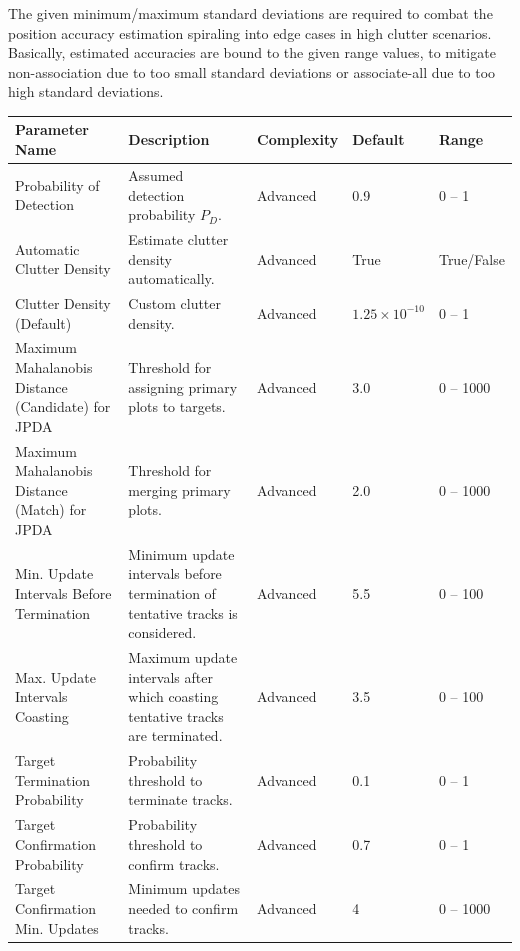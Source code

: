 The given minimum/maximum standard deviations are required to combat the position accuracy estimation spiraling into edge cases in high clutter scenarios. 
Basically, estimated accuracies are bound to the given range values, to mitigate non-association due to too small standard deviations or associate-all due to too high standard deviations. \\


\begin{table}[H]
    \centering
    \footnotesize
    \hspace*{-1.5cm}
    \begin{tabular}{|p{4.5cm}|p{6.5cm}|l|l|l|}
    \hline
    \textbf{Parameter Name} & \textbf{Description} & \textbf{Complexity} & \textbf{Default} & \textbf{Range} \\ \hline
    Probability of Detection & Assumed detection probability $P_D$. & Advanced & 0.9 & 0 -- 1 \\ \hline
    Automatic Clutter Density & Estimate clutter density automatically. & Advanced & True & True/False \\ \hline
    Clutter Density (Default) & Custom clutter density. & Advanced & $1.25 \times 10^{-10}$ & 0 -- 1 \\ \hline
    Maximum Mahalanobis Distance (Candidate) for JPDA & Threshold for assigning primary plots to targets. & Advanced & 3.0 & 0 -- 1000 \\ \hline
    Maximum Mahalanobis Distance (Match) for JPDA & Threshold for merging primary plots. & Advanced & 2.0 & 0 -- 1000 \\ \hline
    Min. Update Intervals Before Termination & Minimum update intervals before termination of tentative tracks is considered. & Advanced & 5.5 & 0 -- 100 \\ \hline
    Max. Update Intervals Coasting & Maximum update intervals after which coasting tentative tracks are terminated. & Advanced & 3.5 & 0 -- 100 \\ \hline
    Target Termination Probability & Probability threshold to terminate tracks. & Advanced & 0.1 & 0 -- 1 \\ \hline 
    Target Confirmation Probability & Probability threshold to confirm tracks. & Advanced & 0.7 & 0 -- 1 \\ \hline
    Target Confirmation Min. Updates & Minimum updates needed to confirm tracks. & Advanced & 4 & 0 -- 1000 \\ \hline
    \end{tabular}
\end{table}

